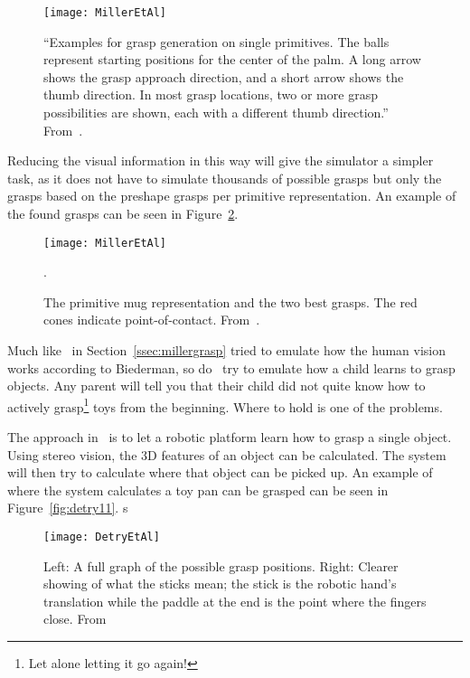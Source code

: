 \begin{figure}
	\centering
	\texttt{[image: MillerEtAl]}
	\caption{``Examples for grasp generation on single primitives.
    The balls represent starting positions for the center of the palm.
    A long arrow shows the grasp approach direction, and a short arrow shows the thumb direction.
    In most grasp locations, two or more grasp possibilities are shown, each with a different thumb direction.'' From~\cite{miller}.}
\label{fig:miller4}
\end{figure}

Reducing the visual information in this way will give the simulator a simpler task,
as it does not have to simulate thousands of possible grasps but only the grasps based on the preshape grasps per primitive representation.
An example of the found grasps can be seen in Figure~\ref{fig:miller6}.

\begin{figure}
	\centering
	\texttt{[image: MillerEtAl]}
	\caption{The primitive mug representation and the two best grasps. The red cones indicate point-of-contact. From~\cite{miller}.}
\label{fig:miller6}.
\end{figure}

Much like~\cite{miller} in Section~\ref{ssec:millergrasp} tried to emulate how the human vision works according to Biederman,
so do~\cite{detry} try to emulate how a child learns to grasp objects.
Any parent will tell you that their child did not quite know how to actively grasp\footnote{Let alone letting it go again!} toys from the beginning.
Where to hold is one of the problems.

The approach in~\cite{detry} is to let a robotic platform learn how to grasp a single object. 
Using stereo vision, the 3D features of an object can be calculated.
The system will then try to calculate where that object can be picked up.
An example of where the system calculates a toy pan can be grasped can be seen in Figure~\vref{fig:detry11}. s

\begin{figure}
	\centering
	\texttt{[image: DetryEtAl]}
	\caption{Left: A full graph of the possible grasp positions.
		Right: Clearer showing of what the sticks mean;
		the stick is the robotic hand's translation while the paddle at the end is the point where the fingers close. From~\cite{detry}}
	\label{fig:detry11}
\end{figure}

